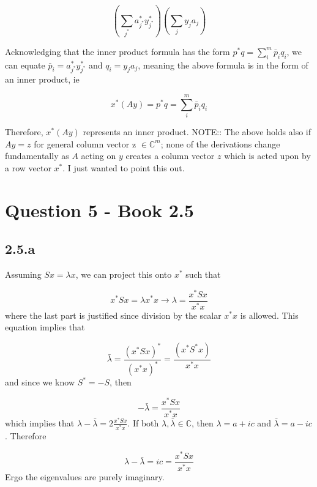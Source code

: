 \documentclass[a4paper,12pt]{article}
\begin{document}
\begin{equation}
(\sum_{j^*} a_{j^*}^* y_{j^*}^*  )(\sum_j y_j a_j)
\end{equation}

Acknowledging that the inner product formula has the form $p^* q = \sum_i^m \bar{p}_i q_i$, we can equate $\bar{p}_i =a_{j^*}^* y_{j^*}^*$ and $q_i=y_j a_j$, meaning the above formula is in the form of an inner product, ie

\begin{equation}
x^*(Ay) = p^* q = \sum_i^m \bar{p}_i q_i
\end{equation}

Therefore, $x^*(Ay)$ represents an inner product. NOTE:: The above holds also if $Ay=z$ for general column vector z $\in \mathbb{C}^m$; none of the derivations change fundamentally as $A$ acting on $y$ creates a column vector $z$ which is acted upon by a row vector $x^*$. I just wanted to point this out.



\section{Question 5 - Book 2.5}
\subsection{2.5.a}
Assuming $Sx=\lambda x$, we can project this onto $x^*$ such that

\begin{equation}
x^* Sx=\lambda x^*x \rightarrow \lambda = \frac{x^* Sx}{x^* x}
\end{equation} where the last part is justified since division by the scalar $x^*x$ is allowed. This equation implies that

\begin{equation}
\bar{\lambda} =\frac{(x^* Sx)^*}{(x^* x)^*} =\frac{(x^*S^*x)}{x^* x}
\end{equation} and since we know $S^* = -S$, then 

\begin{equation}
- \bar{\lambda} = \frac{x^* Sx}{x^* x}
\end{equation} which implies that $ \lambda  -\bar{\lambda}= 2\frac{x^* Sx}{x^* x}$. If both $\lambda , \bar{\lambda} \in \mathbb{C} $, then $\lambda = a +ic$ and $\bar{\lambda} = a - ic$. Therefore

\begin{equation}
\lambda  -\bar{\lambda} = ic = \frac{x^* Sx}{x^* x}
\end{equation} Ergo the eigenvalues are purely imaginary.
\end{document}
